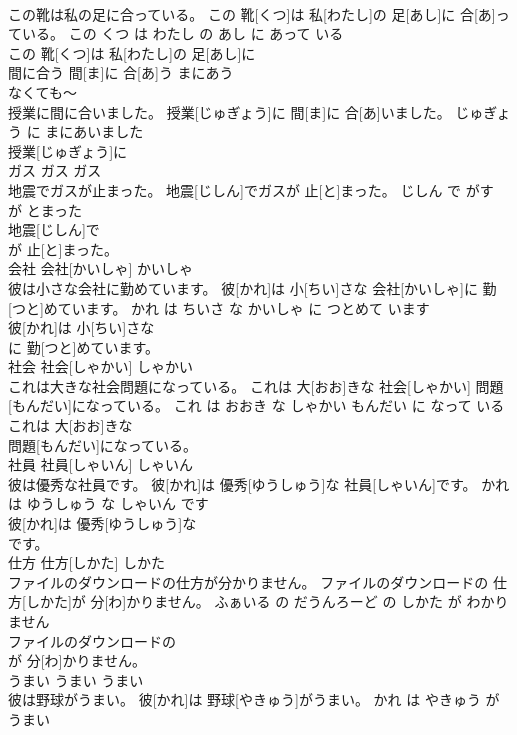 \documentclass[8pt]{extreport}
\begin{document}
\begin{CJK}{UTF8}{min}
\\	この靴は私の足に合っている。	この 靴[くつ]は 私[わたし]の 足[あし]に 合[あ]っている。	この くつ は わたし の あし に あって いる	
\\	この 靴[くつ]は 私[わたし]の 足[あし]に
\\	間に合う	間[ま]に 合[あ]う	まにあう	
\\	なくても〜 
\\	授業に間に合いました。	授業[じゅぎょう]に 間[ま]に 合[あ]いました。	じゅぎょう に まにあいました	
\\	授業[じゅぎょう]に
\\	ガス	ガス	ガス	
\\	地震でガスが止まった。	地震[じしん]でガスが 止[と]まった。	じしん で がす が とまった	
\\	地震[じしん]で
\\	が 止[と]まった。		
\\	会社	会社[かいしゃ]	かいしゃ	
\\	彼は小さな会社に勤めています。	彼[かれ]は 小[ちい]さな 会社[かいしゃ]に 勤[つと]めています。	かれ は ちいさ な かいしゃ に つとめて います	
\\	彼[かれ]は 小[ちい]さな
\\	に 勤[つと]めています。		
\\	社会	社会[しゃかい]	しゃかい	
\\	これは大きな社会問題になっている。	これは 大[おお]きな 社会[しゃかい] 問題[もんだい]になっている。	これ は おおき な しゃかい もんだい に なって いる	
\\	これは 大[おお]きな
\\	問題[もんだい]になっている。		
\\	社員	社員[しゃいん]	しゃいん	
\\	彼は優秀な社員です。	彼[かれ]は 優秀[ゆうしゅう]な 社員[しゃいん]です。	かれ は ゆうしゅう な しゃいん です	
\\	彼[かれ]は 優秀[ゆうしゅう]な
\\	です。		
\\	仕方	仕方[しかた]	しかた	
\\	ファイルのダウンロードの仕方が分かりません。	ファイルのダウンロードの 仕方[しかた]が 分[わ]かりません。	ふぁいる の だうんろーど の しかた が わかりません	
\\	ファイルのダウンロードの
\\	が 分[わ]かりません。		
\\	うまい	うまい	うまい	
\\	彼は野球がうまい。	彼[かれ]は 野球[やきゅう]がうまい。	かれ は やきゅう が うまい	

\end{CJK}
\end{document}

